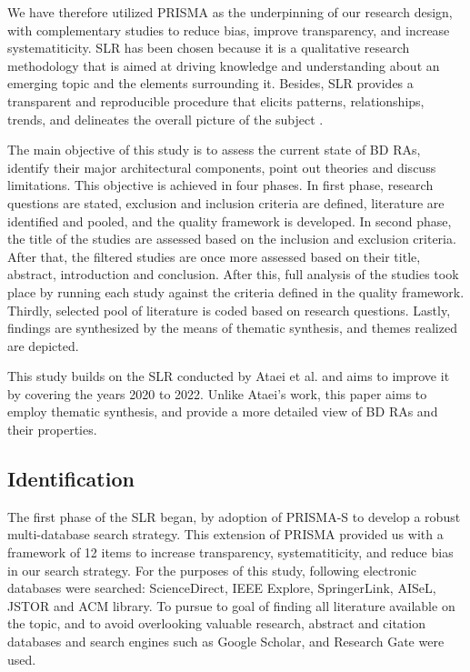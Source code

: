 \documentclass{ieeeaccess}
\begin{document}
We have therefore utilized PRISMA as the underpinning of our research design, with complementary studies to reduce bias, improve transparency, and increase systematiticity. SLR has been chosen because it is a qualitative research methodology that is aimed at driving knowledge and understanding about an emerging topic and the elements surrounding it. Besides, SLR provides a transparent and reproducible procedure that elicits patterns, relationships, trends, and delineates the overall picture of the subject \cite{borrego2014systematic}.

The main objective of this study is to assess the current state of BD RAs, identify their major architectural components, point out theories and discuss limitations. This objective is achieved in four phases. In first phase, research questions are stated, exclusion and inclusion criteria are defined, literature are identified and pooled, and the quality framework is developed. In second phase, the title of the studies are assessed based on the inclusion and exclusion criteria. After that, the filtered studies are once more assessed based on their title, abstract, introduction and conclusion. After this, full analysis of the studies took place by running each study against the criteria defined in the quality framework. Thirdly, selected pool of literature is coded based on research questions. Lastly, findings are synthesized by the means of thematic synthesis, and themes realized are depicted.

This study builds on the SLR conducted by Ataei et al. \cite{AtaeiACIS} and aims to improve it by covering the years 2020 to 2022. Unlike Ataei's work, this paper aims to employ thematic synthesis, and provide a more detailed view of BD RAs and their properties.

\subsection{Identification}

The first phase of the SLR began, by adoption of PRISMA-S \cite{rethlefsen2021prisma} to develop a robust multi-database search strategy. This extension of PRISMA provided us with a framework of 12 items to increase transparency, systematiticity, and reduce bias in our search strategy. For the purposes of this study, following electronic databases were searched: ScienceDirect, IEEE Explore, SpringerLink, AISeL, JSTOR and ACM library. To pursue to goal of finding all literature available on the topic, and to avoid overlooking valuable research, abstract and citation databases and search engines such as Google Scholar, and Research Gate were used.
\end{document}
